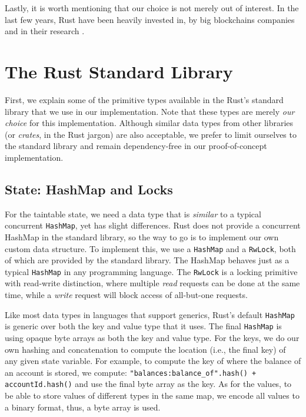 Lastly, it is worth mentioning that our choice is not merely out of interest. In the last few years,
Rust have been heavily invested in, by big blockchains companies and in their research
\cite{RustBlockchain}.

\section{The Rust Standard Library}

First, we explain some of the primitive types available in the Rust's standard library that we use
in our implementation. Note that these types are merely \textit{our choice} for this implementation.
Although similar data types from other libraries (or \textit{crates}, in the Rust jargon) are also
acceptable, we prefer to limit ourselves to the standard library and remain dependency-free in our
proof-of-concept implementation.

\subsection{State: HashMap and Locks} \label{chap:impl:subsec:state_and_concurrent_map}

For the taintable state, we need a data type that is \textit{similar} to a typical concurrent
\texttt{HashMap}\cite{barnatFastDynamicallySizedConcurrent2015}, yet has slight differences. Rust
does not provide a concurrent HashMap in the standard library, so the way to go is to
implement our own custom data structure. To implement this, we use a \texttt{HashMap} and a
\texttt{RwLock}, both of which are provided by the standard library. The HashMap behaves just as a
typical \texttt{HashMap} in any programming language. The \texttt{RwLock} is a locking primitive
with read-write distinction, where multiple \textit{read} requests can be done at the same time,
while a \textit{write} request will block access of all-but-one requests.

Like most data types in languages that support generics, Rust's default \texttt{HashMap} is
generic over both the key and value type that it uses. The final \texttt{HashMap} is using opaque
byte arrays as both the key and value type. For the keys, we do our own hashing and concatenation to
compute the location (i.e., the final key) of any given state variable. For example, to compute the
key of where the balance of an account is stored, we compute: \texttt{"balances:balance\_of".hash()
+ accountId.hash()} and use the final byte array as the key. As for the values, to be able to store
values of different types in the same map, we encode all values to a binary format, thus, a byte
array is used.

